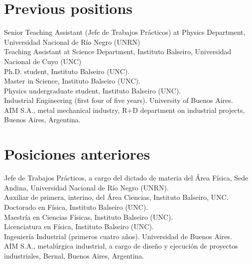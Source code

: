 \ifeng
\section*{Previous positions}
\noindent
{} Senior Teaching Assistant (Jefe de Trabajos Prácticos) at Physics Department, Universidad Nacional de Río Negro (UNRN)\\
 Teaching Assistant at Science Department, Instituto Balseiro, Universidad Nacional de Cuyo (UNC)\\
Ph.D. student, Instituto Balseiro (UNC).\\
Master in Science, Instituto Balseiro (UNC).\\
Physics undergraduate student, Instituto Balseiro (UNC).\\
Industrial Engineering (first four of five years). University of Buenos Aires.\\
AIM S.A., metal mechanical industry, R+D department on industrial projects, Buenos Aires, Argentina.\\
\else
\section*{Posiciones anteriores}
\noindent
{} Jefe de Trabajos Prácticos, a cargo del dictado de materia del Área Física, Sede Andina, Universidad Nacional de Río Negro (UNRN).\\
 Auxiliar de primera, interino, del Área Ciencias, Instituto Balseiro, UNC.\\
Doctorado en Física, Instituto Balseiro (UNC).\\
Maestría en Ciencias Físicas, Instituto Balseiro (UNC).\\
Licenciatura en Física, Instituto Balseiro (UNC).\\
Ingeniería Industrial (primeros cuatro años). Universidad de Buenos Aires.\\
AIM S.A., metalúrgica industrial, a cargo de diseño y ejecución de proyectos industriales, Bernal, Buenos Aires, Argentina.\\
\fi


